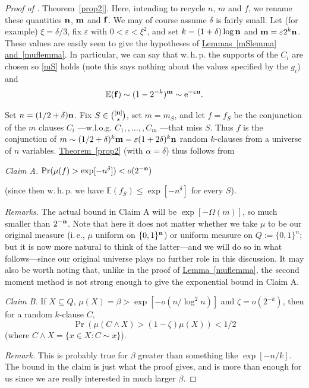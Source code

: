 \documentclass[11pt]{article}
\numberwithin{equation}{section}
\theoremstyle{definition}
\theoremstyle{plain}
\newcommand{\eee}{\mathrm e}
\newcommand{\ie}{i.\,e.}
\newcommand{\expref}[2]{\hyperref[#2]{#1~\ref{#2}}}
\newcommand{\nn}[0]{{\bf n}}
\newcommand{\mm}[0]{{\bf m}}
\newcommand{\beq}[1]{\begin{equation}\label{#1}}
\newcommand{\enq}[0]{\end{equation}}
\newcommand{\mn}[0]{\medskip\noindent}
\newcommand{\sub}[0]{\subseteq}
\renewcommand{\dots}[0]{,\ldots,}
\newcommand{\ff}[0]{{\bf f}}
\newcommand{\0}[0]{\emptyset}
\newcommand{\ga}[0]{\alpha }
\newcommand{\gb}[0]{\beta }
\newcommand{\gd}[0]{\delta }
\newcommand{\gO}[0]{\Omega}
\newcommand{\gz}[0]{\zeta}
\newcommand{\eps}[0]{\varepsilon }
\begin{document}
\mn
%
%
\begin{proof}[Proof of \expref{Theorem}{prop2}].   %
Here, intending to recycle $n$, $m$ and $f$, we rename
these quantities
$\nn$, $\mm$ and $\ff$.
We may of course assume $\gd$ is fairly small.
Let (for example) $\xi = \gd/3$, fix $\eps$ with
$0<\eps < \xi^2$, and set
$k=(1+\gd)\log \nn$ and $\mm = \eps 2^k \nn$.
These values are easily seen to give the hypotheses of
\expref{Lemmas}{mSlemma} \expref{and}{muflemma}.
In particular, we can say that w.\,h.\,p.
the supports of the %
$C_i$  %
are chosen so \eqref{mS} holds
(note this says nothing about the values specified by
%
the $g_i$) %
and
\beq{mS'}
\mathbb E (\ff)\sim (1-2^{-k})^\mm\sim \eee^{-\eps \nn}.
\enq




Set $n=(1/2+\gd) \nn$.
Fix %
$S\in \binom{[\nn]}{s}$, %
set $m=m_S$,
and
let $f=f_S$ be the %
conjunction  %
of the $m$ %
clauses $C_i$%
---w.l.o.g. %
$C_1,\dots, C_m$%
---that miss $S$.
Thus $f$ is the %
conjunction of %
$m\sim (1/2+\gd)^k\mm =\eps (1+2\gd)^k\nn$
random $k$-clauses from a universe of $n$ variables.
\expref{Theorem}{prop2} (with $\ga=\gd$) thus follows from

\mn
\emph{Claim A.}
$\Pr(\mu(f)  > \exp[-n^{\gd}]) < o(2^{-\nn})$

\mn
(since then w.\,h.\,p. we have $\mathbb E (f_S)\leq \exp[-n^{\gd}]$ for every $S$).


\mn
\emph{Remarks.}
The actual bound in Claim A will be
$\exp[-\gO(m)]$,
so much smaller than $2^{-\nn}$.
Note that here it %
does not %
matter whether we take $\mu$ to be
our original measure (\ie, $\mu$ uniform on $\{0,1\}^\nn$)
or uniform measure on $Q:=\{0,1\}^n$;
but it is %
now more natural to think of
the latter---and we will do so in what follows---since
our original universe plays no further role in this discussion.
It may also be worth noting that, unlike in the proof of
\expref{Lemma}{muflemma}, the second moment method is not strong
enough to give the exponential bound in Claim A.




\mn
\emph{Claim B.}
If $X\sub Q$,
$\mu (X) =\gb> \exp[-o(n/\log^2n)]$ and $\gz =o(2^{-k})$,
then for a random $k$-clause $C$,
$$
\Pr(\mu (C\wedge X) >(1-\gz)\mu (X)) < 1/2
$$
(where $C\wedge X =\{x\in X: C\sim x\}$).


\mn
\emph{Remark.}  This is probably true for
$\gb$ greater than something like $\exp[-n/k]$.
The bound in the claim
is just what the proof gives, and is more than enough
for us since %
we are %
really interested in much larger $\gb$.



\end{proof}
\end{document}
